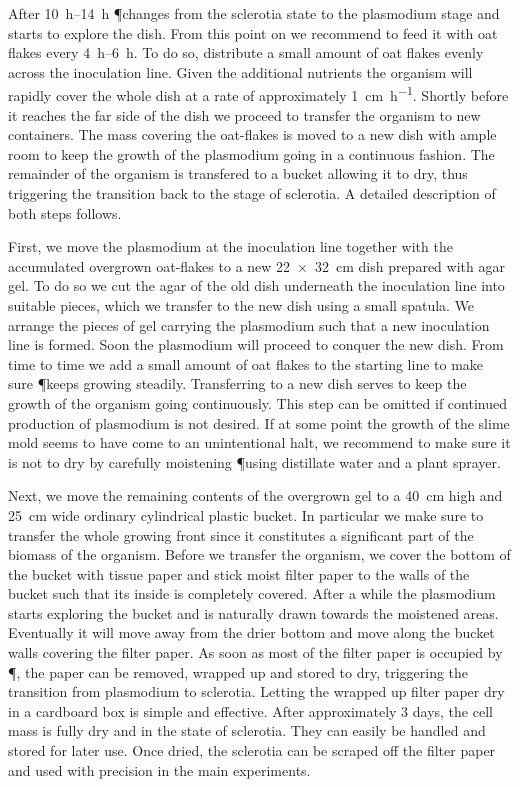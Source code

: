 		After \SIrange{10}{14}{\hour} \P changes from the sclerotia state to the plasmodium stage and starts to explore the dish. From this point on we recommend to feed it with oat flakes every \SIrange{4}{6}{\hour}. To do so, distribute a small amount of oat flakes evenly across the inoculation line. Given the additional nutrients the organism will rapidly cover the whole dish at a rate of approximately \SI{1}{\centi\metre\per\hour}. Shortly before it reaches the far side of the dish we proceed to transfer the organism to new containers. The mass covering the oat-flakes is moved to a new dish with ample room to keep the growth of the plasmodium going in a continuous fashion. The remainder of the organism is transfered to a bucket allowing it to dry, thus triggering the transition back to the stage of sclerotia. A detailed description of both steps follows.

		First, we move the plasmodium at the inoculation line together with the accumulated overgrown oat-flakes to a new \SI{22 x 32}{\centi\metre} dish prepared with agar gel. To do so we cut the agar of the old dish underneath the inoculation line into suitable pieces, which we transfer to the new dish using a small spatula. We arrange the pieces of gel carrying the plasmodium such that a new inoculation line is formed. Soon the plasmodium will proceed to conquer the new dish. From time to time we add a small amount of oat flakes to the starting line to make sure \P keeps growing steadily. Transferring to a new dish serves to keep the growth of the organism going continuously. This step can be omitted if continued production of plasmodium is not desired. If at some point the growth of the slime mold seems to have come to an unintentional halt, we recommend to make sure it is not to dry by carefully moistening \P using distillate water and a plant sprayer.

		Next, we move the remaining contents of the overgrown gel to a \SI{40}{\centi\metre} high and \SI{25}{\centi\metre} wide ordinary cylindrical plastic bucket. In particular we make sure to transfer the whole growing front since it constitutes a significant part of the biomass of the organism. Before we transfer the organism, we cover the bottom of the bucket with tissue paper and stick moist filter paper to the walls of the bucket such that its inside is completely covered. After a while the plasmodium starts exploring the bucket and is naturally drawn towards the moistened areas. Eventually it will move away from the drier bottom and move along the bucket walls covering the filter paper. As soon as most of the filter paper is occupied by \P, the paper can be removed, wrapped up and stored to dry, triggering the transition from plasmodium to sclerotia. Letting the wrapped up filter paper dry in a cardboard box is simple and effective. After approximately $3$ days, the cell mass is fully dry and in the state of sclerotia. They can easily be handled and stored for later use. Once dried, the sclerotia can be scraped off the filter paper and used with precision in the main experiments.

